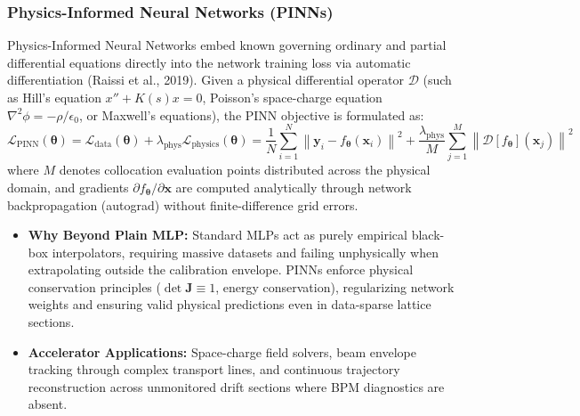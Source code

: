 \documentclass[11pt,a4paper]{article}
\begin{document}
\subsubsection{Physics-Informed Neural Networks (PINNs)}
Physics-Informed Neural Networks embed known governing ordinary and partial differential equations directly into the network training loss via automatic differentiation (Raissi et al., 2019). Given a physical differential operator $\mathcal{D}$ (such as Hill's equation $x'' + K(s)x = 0$, Poisson's space-charge equation $\nabla^2 \phi = -\rho / \epsilon_0$, or Maxwell's equations), the PINN objective is formulated as:
\begin{equation}
    \mathcal{L}_{\text{PINN}}(\boldsymbol{\theta}) = \mathcal{L}_{\text{data}}(\boldsymbol{\theta}) + \lambda_{\text{phys}} \mathcal{L}_{\text{physics}}(\boldsymbol{\theta}) = \frac{1}{N} \sum_{i=1}^N \left\| \mathbf{y}_i - f_{\boldsymbol{\theta}}(\mathbf{x}_i) \right\|^2 + \frac{\lambda_{\text{phys}}}{M} \sum_{j=1}^M \left\| \mathcal{D}\left[ f_{\boldsymbol{\theta}} \right](\mathbf{x}_j) \right\|^2
\end{equation}
where $M$ denotes collocation evaluation points distributed across the physical domain, and gradients $\partial f_{\boldsymbol{\theta}} / \partial \mathbf{x}$ are computed analytically through network backpropagation (autograd) without finite-difference grid errors.
\begin{itemize}
    \item \textbf{Why Beyond Plain MLP:} Standard MLPs act as purely empirical black-box interpolators, requiring massive datasets and failing unphysically when extrapolating outside the calibration envelope. PINNs enforce physical conservation principles ($\det \mathbf{J} \equiv 1$, energy conservation), regularizing network weights and ensuring valid physical predictions even in data-sparse lattice sections.
    \item \textbf{Accelerator Applications:} Space-charge field solvers, beam envelope tracking through complex transport lines, and continuous trajectory reconstruction across unmonitored drift sections where BPM diagnostics are absent.
\end{itemize}
\end{document}
